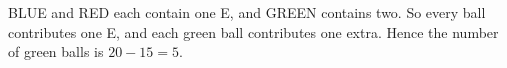 BLUE and RED each contain one E, and GREEN contains two. So every ball contributes one E, and each green ball contributes one extra. Hence the number of green balls is $20-15=\boxed{5}$.
